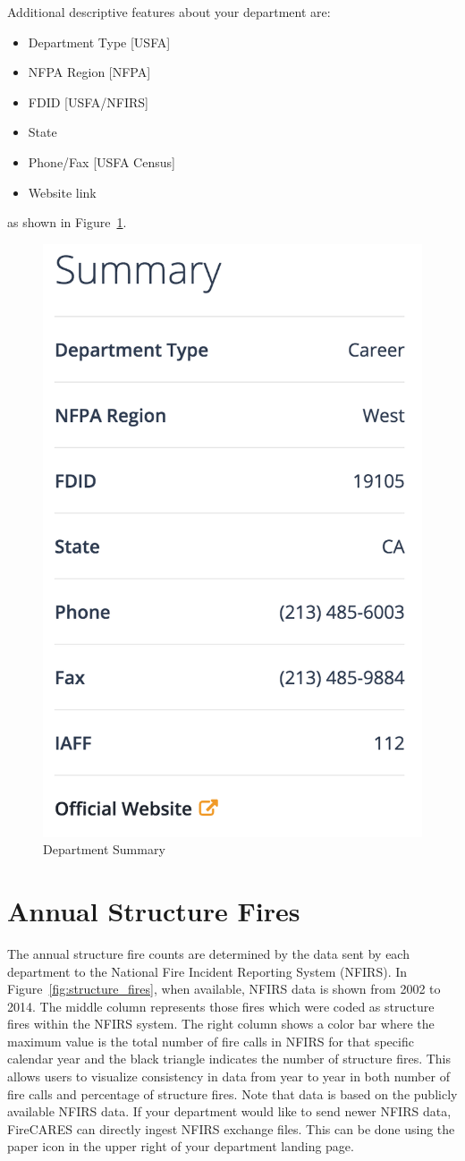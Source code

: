 \documentclass[12pt,oneside]{book}
\begin{document}
\FloatBarrier

Additional descriptive features about your department are:

\begin{itemize}
\item Department Type [USFA]
\item NFPA Region [NFPA]
\item FDID [USFA/NFIRS]
\item State 
\item Phone/Fax [USFA Census]
\item Website link
\end{itemize}

as shown in Figure~\ref{fig:description2}.

\begin{figure}[ht!]
\centering
\includegraphics[width=.5\columnwidth]{Figures/description2}
\caption{Department Summary}
\label{fig:description2}
\end{figure}

\FloatBarrier

\section{Annual Structure Fires}

The annual structure fire counts are determined by the data sent by each department to the National Fire Incident Reporting System (NFIRS). In Figure~\ref{fig:structure_fires}, when available, NFIRS data is shown from 2002 to 2014. The middle column represents those fires which were coded as structure fires within the NFIRS system. The right column shows a color bar where the maximum value is the total number of fire calls in NFIRS for that specific calendar year and the black triangle indicates the number of structure fires. This allows users to visualize consistency in data from year to year in both number of fire calls and percentage of structure fires. Note that data is based on the publicly available NFIRS data. If your department would like to send newer NFIRS data, FireCARES can directly ingest NFIRS exchange files. This can be done using the paper icon in the upper right of your department landing page. 
\end{document}
